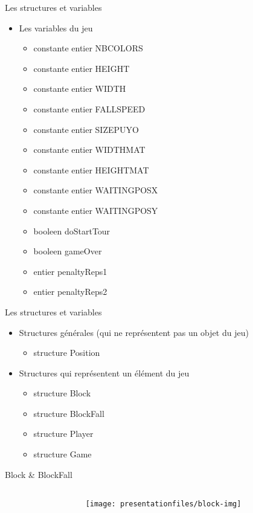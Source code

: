 \documentclass[10pt,dvipsnames,final]{beamer}
\newcommand{\midcolumn}[2]{
\begin{columns}
	\begin{column}{0.5\textwidth}
		#1
	\end{column}
	\begin{column}{0.5\textwidth}
		#2
	\end{column}
\end{columns}
}
\begin{document}
\begin{frame}{Les structures et variables}
\begin{itemize}
\item Les variables du jeu
\begin{itemize}
\item constante entier NBCOLORS 
\item constante entier HEIGHT
\item constante entier WIDTH
\item constante entier FALLSPEED 
\item constante entier SIZEPUYO
\item constante entier WIDTHMAT
\item constante entier HEIGHTMAT
\item constante entier WAITINGPOSX
\item constante entier WAITINGPOSY
\item booleen doStartTour
\item booleen gameOver
\item entier penaltyReps1
\item entier penaltyReps2
\end{itemize}
\end{itemize}
\end{frame}

\begin{frame}{Les structures et variables}
\begin{itemize}
\item Structures générales (qui ne représentent pas un objet du jeu)
\begin{itemize}
\item structure Position
\end{itemize}
\item Structures qui représentent un élément du jeu
\begin{itemize}
\item structure Block
\item structure BlockFall
\item structure Player
\item structure Game
\end{itemize}
\end{itemize}
\end{frame}

\begin{frame}{Block \& BlockFall}
\midcolumn{}{\texttt{[image: presentationfiles/block-img]}}
\end{frame}
\end{document}

